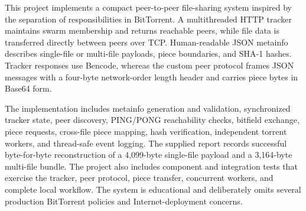 This project implements a compact peer-to-peer file-sharing system inspired by the separation of responsibilities in BitTorrent. A multithreaded HTTP tracker maintains swarm membership and returns reachable peers, while file data is transferred directly between peers over TCP. Human-readable JSON metainfo describes single-file or multi-file payloads, piece boundaries, and SHA-1 hashes. Tracker responses use Bencode, whereas the custom peer protocol frames JSON messages with a four-byte network-order length header and carries piece bytes in Base64 form.

The implementation includes metainfo generation and validation, synchronized tracker state, peer discovery, PING/PONG reachability checks, bitfield exchange, piece requests, cross-file piece mapping, hash verification, independent torrent workers, and thread-safe event logging. The supplied report records successful byte-for-byte reconstruction of a 4,099-byte single-file payload and a 3,164-byte multi-file bundle. The project also includes component and integration tests that exercise the tracker, peer protocol, piece transfer, concurrent workers, and complete local workflow. The system is educational and deliberately omits several production BitTorrent policies and Internet-deployment concerns.
